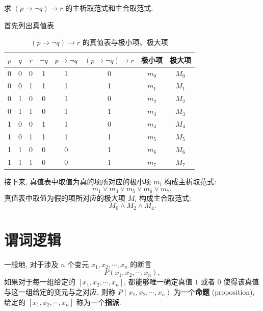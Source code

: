 \documentclass[10pt,UTF8]{book} %
\begin{document}
\begin{example}
    求 $(p \rightarrow \lnot q) \rightarrow r$ 的主析取范式和主合取范式.
    \begin{sol}
        首先列出真值表
        \begin{table}[H]
            \centering
            \caption{$(p \rightarrow \lnot q) \rightarrow r$ 的真值表与极小项、极大项}
            \begin{tabular}{ccc|ccc|cc}
                \hline
                $p$ & $q$ & $r$ & $\lnot q$ & $p \to \lnot q$ & $(p \rightarrow \lnot q) \rightarrow r$ & 极小项 & 极大项 \\ 
                \hline 
                0 & 0 & 0 & 1 & 1 & 0 & $m_0$ & $M_0$ \\
                0 & 0 & 1 & 1 & 1 & 1 & $m_1$ & $M_1$ \\
                0 & 1 & 0 & 0 & 1 & 0 & $m_2$ & $M_2$ \\
                0 & 1 & 1 & 0 & 1 & 1 & $m_3$ & $M_3$ \\
                1 & 0 & 0 & 1 & 1 & 0 & $m_4$ & $M_4$ \\
                1 & 0 & 1 & 1 & 1 & 1 & $m_5$ & $M_5$ \\
                1 & 1 & 0 & 0 & 0 & 1 & $m_6$ & $M_6$ \\
                1 & 1 & 1 & 0 & 0 & 1 & $m_7$ & $M_7$ \\
                \hline
            \end{tabular}
        \end{table}
        接下来, 真值表中取值为真的项所对应的极小项 $m_i$ 构成主析取范式:
        \[ m_1 \vee m_3 \vee m_5 \vee m_6 \vee m_7, \]
        真值表中取值为假的项所对应的极大项 $M_i$ 构成主合取范式:
        \[ M_0 \wedge M_2 \wedge M_4. \]
    \end{sol}
\end{example}

\section{谓词逻辑}

一般地, 对于涉及 $n$ 个变元 $x_1,x_2,\cdots, x_n$ 的断言
\[ P(x_1,x_2,\cdots,x_n), \]
如果对于每一组给定的 $[x_1,x_2,\cdots,x_n]$, 都能够唯一确定真值 $1$ 或者 $0$
使得该真值与这一组给定的变元与之对应, 则称 $P(x_1,x_2,\cdots,x_n)$ 为一个\textbf{命题}
(proposition),
给定的 $[x_1,x_2,\cdots,x_n]$ 称为一个\textbf{指派}.
\end{document}

